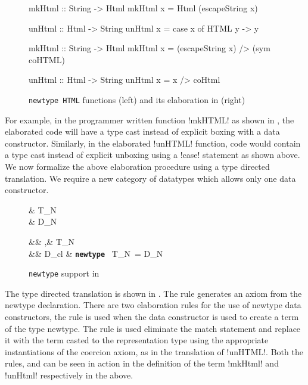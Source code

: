 \documentclass[screen,nonacm,manuscript,review]{acmart} %
\begin{document}
\begin{figure}[ht]
  \centering
  \begin{minipage}[ht]{0.5\linewidth}
    \begin{code}
      mkHtml :: String -> Html
      mkHtml x = Html (escapeString x)

      unHtml :: Html -> String
      unHtml x = case x of HTML y -> y
    \end{code}
  \end{minipage}%
  \begin{minipage}[ht]{0.5\linewidth}
    \begin{code}
      mkHtml :: String -> Html
      mkHtml x = (escapeString x) /> (sym coHTML)

      unHtml :: Html -> String
      unHtml x = x /> coHtml
    \end{code}
  \end{minipage}
  \caption[\lstinline{HTML}]{\lstinline{newtype HTML} functions (left) and its elaboration in \SFC (right)}
  \label{fig:newtype-html-example}
\end{figure}

For example, in the programmer written function !mkHTML! as shown in , the elaborated \SFC code will have a type cast instead of explicit boxing with a data constructor. Similarly, in the elaborated !unHTML! function, code would contain a type cast instead of explicit unboxing using a !case! statement as shown above. We now formalize the above elaboration procedure using a type directed translation. We require a new category of datatypes which allows only one data constructor.

\begin{figure}[ht]
  \centering
  \begin{syntax}
     & T_N\\
     & D_N
  \end{syntax}
  \begin{syntax}
                   && \tau,\sigma \bnfeq& \alpha \bnfor \cdots \bnfor T_N\\
     && D_{cl} \bnfeq& \texttt{\textbf{newtype}}~ T_{N}~\many\alpha = D_N\App\tau\\
  \end{syntax}
  \caption{\lstinline{newtype} support in \SFC}
  \label{fig:newtypes-sfc}
\end{figure}

The type directed translation is shown in
. The rule  generates an axiom
from the newtype declaration. There are two elaboration rules for the
use of newtype data constructors, the rule  is used
when the data constructor is used to create a term of the type
newtype. The rule  is used eliminate the match
statement and replace it with the term casted to the representation
type using the appropriate instantiations of the coercion axiom, as in
the translation of !unHTML!. Both the rules,  and
 can be seen in action in the definition of the term
!mkHtml! and !unHtml! respectively in the  above.
\end{document}
